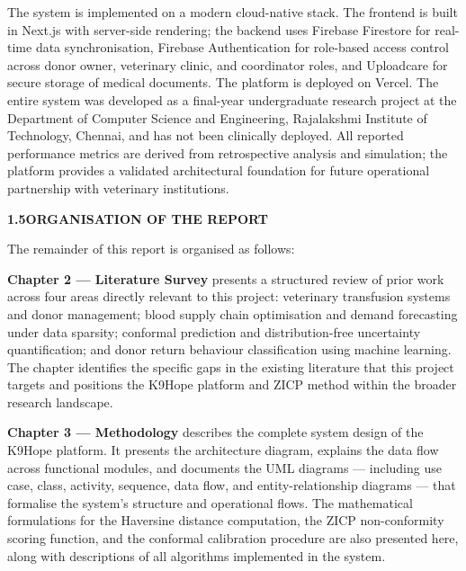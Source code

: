 \documentclass[12pt,a4paper]{article}
\begin{document}
\noindent The system is implemented on a modern cloud-native stack. The frontend is built in Next.js with server-side rendering; the backend uses Firebase Firestore for real-time data synchronisation, Firebase Authentication for role-based access control across donor owner, veterinary clinic, and coordinator roles, and Uploadcare for secure storage of medical documents. The platform is deployed on Vercel. The entire system was developed as a final-year undergraduate research project at the Department of Computer Science and Engineering, Rajalakshmi Institute of Technology, Chennai, and has not been clinically deployed. All reported performance metrics are derived from retrospective analysis and simulation; the platform provides a validated architectural foundation for future operational partnership with veterinary institutions.

\vspace{2em}
\noindent\textbf{1.5\quad ORGANISATION OF THE REPORT}
\vspace{0.8em}

\noindent The remainder of this report is organised as follows:

\vspace{0.6em}
\noindent \textbf{Chapter 2 — Literature Survey} presents a structured review of prior work across four areas directly relevant to this project: veterinary transfusion systems and donor management; blood supply chain optimisation and demand forecasting under data sparsity; conformal prediction and distribution-free uncertainty quantification; and donor return behaviour classification using machine learning. The chapter identifies the specific gaps in the existing literature that this project targets and positions the K9Hope platform and ZICP method within the broader research landscape.

\vspace{0.6em}
\noindent \textbf{Chapter 3 — Methodology} describes the complete system design of the K9Hope platform. It presents the architecture diagram, explains the data flow across functional modules, and documents the UML diagrams — including use case, class, activity, sequence, data flow, and entity-relationship diagrams — that formalise the system's structure and operational flows. The mathematical formulations for the Haversine distance computation, the ZICP non-conformity scoring function, and the conformal calibration procedure are also presented here, along with descriptions of all algorithms implemented in the system.
\end{document}

